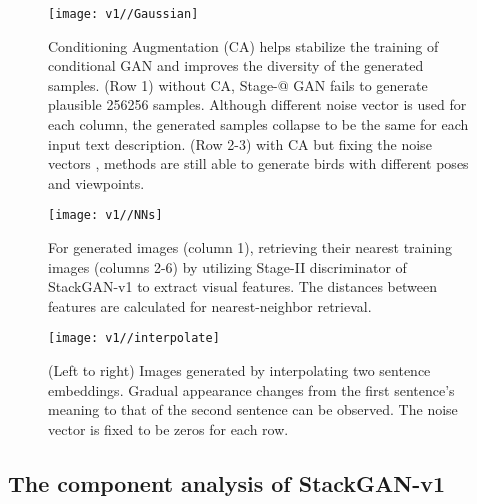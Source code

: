\documentclass[10pt,journal,letterpaper,compsoc]{IEEEtran}
\makeatletter
\newcommand{\Rmnum}[1]{\expandafter\@slowromancap\romannumeral #1@}
\makeatother
\begin{document}
\begin{figure}[bt]
\begin{center}
	\texttt{[image: v1//Gaussian]}
\end{center}
\vspace{-8pt}
   \caption{Conditioning Augmentation (CA) helps stabilize the training of conditional GAN and improves the diversity of the generated samples. 
   (Row 1) without CA, Stage-\Rmnum{1} GAN fails to generate plausible 256256 samples. Although different noise vector  is used for each column, the generated samples collapse to be the same for each input text description. 
   (Row 2-3) with CA but fixing the noise vectors , methods are still able to generate birds with different poses and viewpoints.}
\vspace{-5pt}
\label{fig:Gaussian}
\end{figure}


\begin{figure}[bt]
\begin{center}
	\texttt{[image: v1//NNs]}
\end{center}
\vspace{-8pt}
   \caption{For generated images (column 1), retrieving their nearest training images (columns 2-6) by utilizing Stage-II discriminator of StackGAN-v1 to extract visual features. The  distances between features are calculated for nearest-neighbor retrieval.}
\vspace{-5pt}
\label{fig:NNs}
\end{figure}


\begin{figure}[bt]
\begin{center}
	\texttt{[image: v1//interpolate]}
\end{center}
\vspace{-8pt}
   \caption{(Left to right) Images generated by interpolating two sentence embeddings. Gradual appearance changes from the first sentence's meaning to that of the second sentence can be observed. The noise vector  is fixed to be zeros for each row.}
\vspace{-10pt}
\label{fig:interpolate}
\end{figure}



\subsection{The component analysis of StackGAN-v1}\label{sec:v1_exp}
\end{document}
